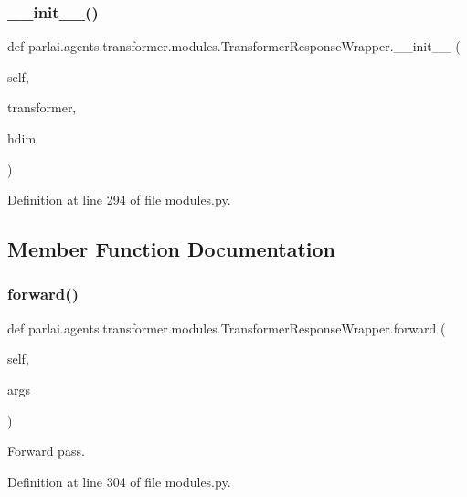 \subsubsection{\texorpdfstring{\+\_\+\+\_\+init\+\_\+\+\_\+()}{\_\_init\_\_()}}
{\footnotesize\ttfamily def parlai.\+agents.\+transformer.\+modules.\+Transformer\+Response\+Wrapper.\+\_\+\+\_\+init\+\_\+\+\_\+ (\begin{DoxyParamCaption}\item[{}]{self,  }\item[{}]{transformer,  }\item[{}]{hdim }\end{DoxyParamCaption})}



Definition at line 294 of file modules.\+py.



\subsection{Member Function Documentation}
\mbox{\label{classparlai_1_1agents_1_1transformer_1_1modules_1_1TransformerResponseWrapper_ad716cb3a5874f46b1aa4beb45ba1b944}} 
\subsubsection{\texorpdfstring{forward()}{forward()}}
{\footnotesize\ttfamily def parlai.\+agents.\+transformer.\+modules.\+Transformer\+Response\+Wrapper.\+forward (\begin{DoxyParamCaption}\item[{}]{self,  }\item[{}]{args }\end{DoxyParamCaption})}

\begin{DoxyVerb}Forward pass.\end{DoxyVerb}
 

Definition at line 304 of file modules.\+py.



